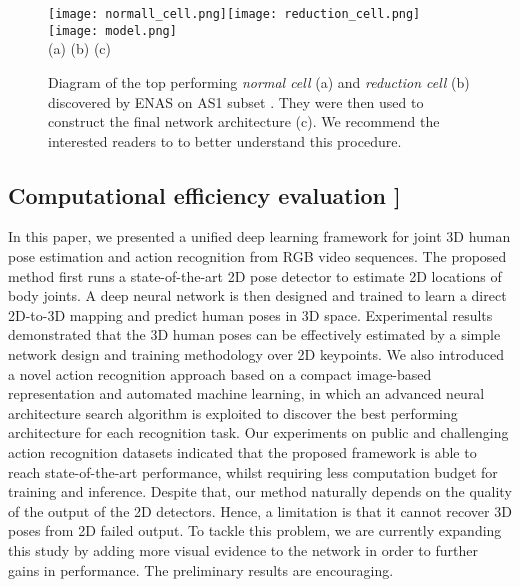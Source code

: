 \documentclass{bmvc2k}
\begin{document}
\begin{figure}[ht]
\begin{center}
\texttt{[image: normall\_cell.png]}\texttt{[image: reduction\_cell.png]} \hspace{0.1cm} \texttt{[image: model.png]}\\
\scriptsize{ \hspace*{2cm} (a) \hspace{5.2cm} (b) \hspace{3cm} (c)}
\vspace*{-0.5cm}
\end{center}
   \caption{Diagram of the top performing \textit{normal cell} (a) and \textit{reduction cell} (b) discovered by ENAS \cite{pmlr-v80-pham18a} on AS1 subset \cite{li2010action}. They were then used to construct the final network architecture (c). We recommend the interested readers to \cite{pmlr-v80-pham18a} to better understand this procedure.} 
\label{fig:6}
\end{figure} 
\subsection{Computational efficiency evaluation  \-0.2cm]} \label{sect:5}
In this paper, we presented a unified deep learning framework for joint 3D human pose estimation and action recognition from RGB video sequences. The proposed method first runs a state-of-the-art 2D pose detector to estimate 2D locations of body joints. A deep neural network is then designed and trained to learn a direct 2D-to-3D mapping and predict human poses in 3D space. Experimental results demonstrated that the 3D human poses can be effectively estimated by a simple network design and training methodology over 2D keypoints. We also introduced a novel action recognition approach based on a compact image-based representation and automated machine learning, in which an advanced neural architecture search algorithm is exploited to discover the best performing architecture for each recognition task. Our experiments on public and challenging action recognition datasets indicated that the proposed framework is able to reach state-of-the-art performance, whilst requiring less computation budget for training and inference. Despite that, our method naturally depends on the quality of the output of the 2D detectors. Hence, a limitation is that it cannot recover 3D poses from 2D failed output. To tackle this problem, we are currently expanding this study by adding more visual evidence to the network in order to further gains in performance. The preliminary results are encouraging. 

\end{document}
